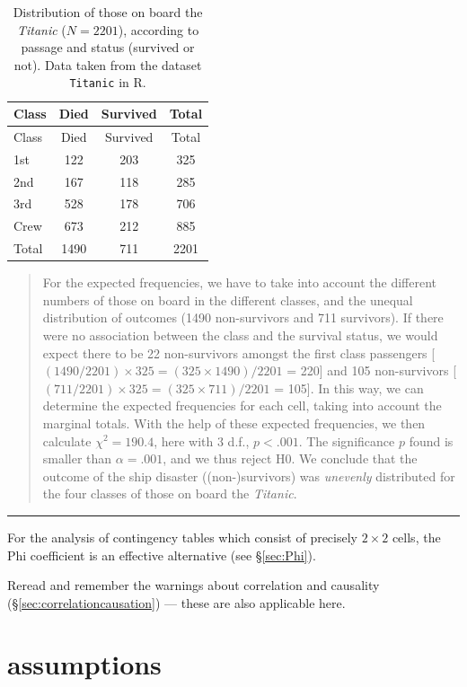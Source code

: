 \documentclass[
]{book}
\begin{document}
\begin{longtable}[]{@{}lccc@{}}
\caption{\label{tab:titanic} Distribution of those on board the \emph{Titanic} (\(N=2201\)),
according to passage
and status (survived or not). Data taken from the dataset
\texttt{Titanic} in R.}\tabularnewline
\toprule
Class & Died & Survived & Total\tabularnewline
\midrule
\endfirsthead
\toprule
Class & Died & Survived & Total\tabularnewline
\midrule
\endhead
1st & 122 & 203 & 325\tabularnewline
2nd & 167 & 118 & 285\tabularnewline
3rd & 528 & 178 & 706\tabularnewline
Crew & 673 & 212 & 885\tabularnewline
Total & 1490 & 711 & 2201\tabularnewline
\bottomrule
\end{longtable}

\begin{quote}
For the expected frequencies, we have to take into account
the different numbers of those on board in the different classes,
and the unequal distribution of outcomes (1490 non-survivors and 711
survivors). If there were no association between the class and the survival
status, we would expect there to be 22 non-survivors amongst the first class
passengers {[}\((1490/2201) \times 325 = (325 \times 1490) / 2201\) = 220{]}
and 105 non-survivors {[}\((711/2201) \times 325 = (325 \times 711) / 2201\) =
105{]}. In this way, we can determine the expected frequencies for each cell,
taking into account the marginal totals. With the help of these
expected frequencies, we then calculate \(\chi^2=190.4\), here with 3 d.f.,
\(p<.001\). The significance \(p\) found is smaller than \(\alpha=.001\), and
we thus reject H0. We conclude that the outcome of the ship disaster
((non-)survivors) was \emph{unevenly} distributed for the four classes of those
on board the \emph{Titanic}.
\end{quote}

\begin{center}\rule{0.5\linewidth}{0.5pt}\end{center}

For the analysis of contingency tables which consist of precisely
\(2\times2\) cells, the Phi coefficient is an effective alternative
(see §\ref{sec:Phi}).

Reread and remember the warnings about correlation and causality
(§\ref{sec:correlationcausation})
--- these are also applicable here.

\hypertarget{sec:chi2test-assumptions}{%
\section{assumptions}\label{sec:chi2test-assumptions}}
\end{document}
